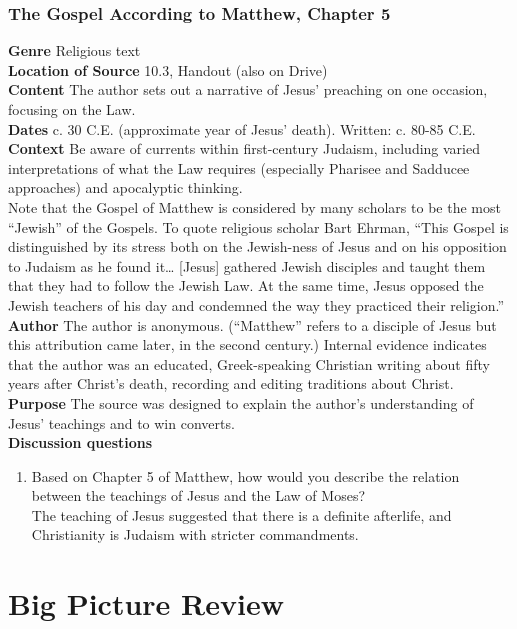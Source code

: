 \documentclass{article}
\begin{document}
\subsubsection*{The Gospel According to Matthew, Chapter 5}
\textbf{Genre}
Religious text \\
\textbf{Location of Source}
10.3, Handout (also on Drive) \\
\textbf{Content}
The author sets out a narrative of Jesus’ preaching on one occasion, focusing on the Law. \\
\textbf{Dates}
c. 30 C.E. (approximate year of Jesus’ death). Written: c. 80-85 C.E. \\
\textbf{Context}
Be aware of currents within first-century Judaism, including varied interpretations of what
the Law requires (especially Pharisee and Sadducee approaches) and apocalyptic thinking. \\
Note that the Gospel of Matthew is considered by many scholars to be the most “Jewish”
of the Gospels. To quote religious scholar Bart Ehrman, “This Gospel is distinguished by its
stress both on the Jewish-ness of Jesus and on his opposition to Judaism as he found it…
[Jesus] gathered Jewish disciples and taught them that they had to follow the Jewish Law.
At the same time, Jesus opposed the Jewish teachers of his day and condemned the way
they practiced their religion.” \\
\textbf{Author}
The author is anonymous. (“Matthew” refers to a disciple of Jesus but this attribution came
later, in the second century.) Internal evidence indicates that the author was an educated,
Greek-speaking Christian writing about fifty years after Christ’s death, recording and editing
traditions about Christ. \\
\textbf{Purpose}
The source was designed to explain the author’s understanding of Jesus’ teachings and to
win converts. \\
\textbf{Discussion questions}
\begin{enumerate}
  \item Based on Chapter 5 of Matthew, how would you describe the relation between the
  teachings of Jesus and the Law of Moses? \\
  The teaching of Jesus suggested that there is a definite afterlife, and Christianity is
  Judaism with stricter commandments.
\end{enumerate}
\section{Big Picture Review}
\end{document}
